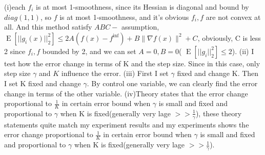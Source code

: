 \documentclass[12pt,a4paper]{article}
\DeclareMathOperator{\E}{\mathrm{E}}
\begin{document}
\newline
(i)each $f_i$ is at most 1-smoothness, since its Hessian is diagonal and bound by $diag(1,1)$, so $f$ is at most 1-smoothness, and it's obvious $f_i,f$ are not convex at all.  And this method satisfy $A B C-$ assumption, $\E\left[||g_i(x)||^2_2\right]\leq 2 A\left(f(x)-f^{\mathrm{inf}}\right)+B\|\nabla f(x)\|^{2}+C$, obviously, C is less 2 since $f_i,f$ bounded by 2, and we can set $A=0,B=0$( $\E\left[||g_i||^2_2\right]\leq 2$).
\newline
(ii) I test how the error change in terms of K and the step size. Since in this case, only step size $\gamma$ and $K$ influence the error.
\newline
(iii) First I set $\gamma$ fixed and change K. Then I set K fixed and change $\gamma$. By control one variable, we can clearly find the error change in terms of the other variable.
\newline
(iv)Theory states that the error change proportional to $\frac{1}{K}$ in certain error bound when $\gamma$ is small and fixed and proportional to $\gamma$ when K is fixed(generally very lage $>>\frac{1}{\gamma}$), these theory statements quite match my experiment results and my experiments shows the error change proportional to $\frac{1}{K}$ in certain error bound when $\gamma$ is small and fixed and proportional to $\gamma$ when K is fixed(generally very lage $>>\frac{1}{\gamma}$).
	
\end{document}
